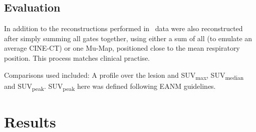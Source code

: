     \vspace{-0.5cm}
    
    \subsection{Evaluation} \label{sec:evaluation}
        
        In addition to the reconstructions performed in~ data were also reconstructed after simply summing all gates together, using either a sum of all  (to emulate an average CINE-CT) or one \gls{Mu-Map}, positioned close to the mean respiratory position. This process matches clinical practise. 
        
        Comparisons used included: A profile over the lesion and \gls{SUV}\textsubscript{max}, \gls{SUV}\textsubscript{median} and \gls{SUV}\textsubscript{peak}. \gls{SUV}\textsubscript{peak} here was defined following \gls{EANM} guidelines.%

\vspace{-0.5cm}

\section{Results} \label{sec:results}
    
    
